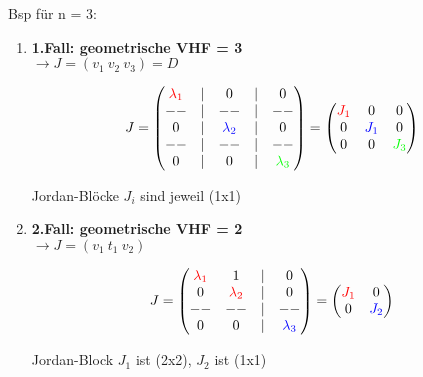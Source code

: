 \documentclass[10pt,a4paper]{article}
\begin{document}
Bsp für n = 3:
\begin{enumerate}[(1)]
    \item \textbf{1.Fall: geometrische VHF = 3}\\
        $\rightarrow J = (v_1 \ v_2 \ v_3) = D$

  \begin{mdframed}[style=exercise]
    \begin{align}
    J = \begin{pmatrix}
        \textcolor{red}{\lambda_1}  & | & 0  & | & 0 \\
            --          & | &--              & | & -- \\
             0          & | & \textcolor{blue}{\lambda_2} & | & 0 \\
            --          & | & --             & | &  --\\
             0          & | & 0              & | & \textcolor{green}{\lambda_3}
        \end{pmatrix} = 
        \begin{pmatrix}
            \textcolor{red}{J_1} & 0 & 0\\
            0 & \textcolor{blue}{J_1} & 0\\
            0 & 0 & \textcolor{green}{J_3}
        \end{pmatrix}
    \end{align}
  \end{mdframed}
Jordan-Blöcke $J_i$ sind jeweil (1x1)
    \item \textbf{2.Fall: geometrische VHF = 2}\\
        $\rightarrow J = (v_1 \ t_1 \ v_2)$

  \begin{mdframed}[style=exercise]
    \begin{align}
    J = \begin{pmatrix}
        \textcolor{red}{\lambda_1}  & 1  & | & 0 \\
             0            & \textcolor{red}{\lambda_2} & | & 0 \\
            --            & --             & | &  --\\
             0            & 0              & | & \textcolor{blue}{\lambda_3}
        \end{pmatrix} = 
        \begin{pmatrix}
            \textcolor{red}{J_1} & 0 \\
            0 & \textcolor{blue}{J_2}\\
        \end{pmatrix}
    \end{align}
  \end{mdframed}
    Jordan-Block $J_1$ ist (2x2), $J_2$ ist (1x1)


\end{enumerate}
\end{document}
